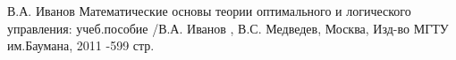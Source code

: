 \documentclass[letterpaper,12pt]{article}
\begin{document}










\begin{thebibliography}{9}
В.А. Иванов Математические основы теории оптимального и логического управления: учеб.пособие /В.А. Иванов , В.С. Медведев, Москва, Изд-во МГТУ им.Баумана, 2011 -599 стр. 



\end{thebibliography}
\end{document}
